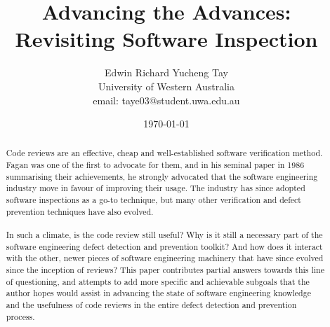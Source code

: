 \documentclass{cshonours}
\title{Advancing the Advances: Revisiting Software Inspection}
\author{Edwin Richard Yucheng Tay \\
University of Western Australia \\
email: taye03@student.uwa.edu.au }
\date{\today}
\begin{document}
\maketitle

\begin{abstract}
Code reviews are an effective, cheap and well-established software verification method.
Fagan was one of the first to advocate for them, and in his seminal paper in 1986 summarising their
achievements, he strongly advocated that the software engineering industry move in favour of
improving their usage.
The industry has since adopted software inspections as a go-to technique, but many other
verification and defect prevention techniques have also evolved.\\
\\
In such a climate, is the code review still useful?
Why is it still a necessary part of the software engineering defect detection and prevention
toolkit?
And how does it interact with the other, newer pieces of software engineering machinery that have
since evolved since the inception of reviews?
This paper contributes partial answers towards this line of questioning, and attempts to add more
specific and achievable subgoals that the author hopes would assist in advancing the state of
software engineering knowledge and the usefulness of code reviews in the entire defect detection and
prevention process.
\end{abstract}

\pagebreak

\tableofcontents









\appendix




\end{document}
